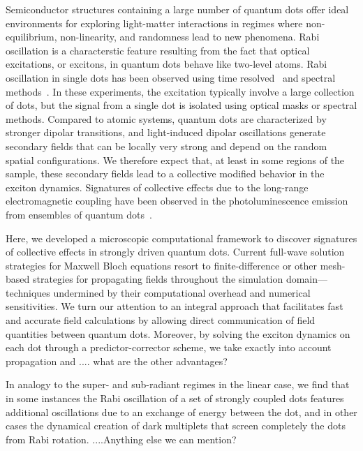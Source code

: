Semiconductor structures containing a large number of quantum dots offer ideal environments for exploring light-matter interactions in regimes where non-equilibrium, non-linearity, and randomness lead to new phenomena.
Rabi oscillation is a characterstic feature resulting from the fact that optical excitations, or excitons, in quantum dots behave like two-level atoms.
Rabi oscillation in single dots has been observed using time resolved~\cite{stievater, shih} and spectral methods~\cite{kamada}.
 In these experiments, the excitation typically involve a large collection of dots, but the signal from a single dot is isolated using optical masks or spectral methods.
Compared to atomic systems, quantum dots are characterized by stronger dipolar transitions, and light-induced dipolar oscillations generate secondary fields that can be locally very strong and depend on the random spatial configurations.
We therefore expect that, at least in some regions of the sample, these secondary fields lead to a collective modified behavior in the exciton dynamics.
 Signatures of collective effects due to the long-range electromagnetic coupling have been observed in the photoluminescence emission from ensembles of quantum dots~\cite{forchel}.


Here, we developed a microscopic computational framework to discover signatures of collective effects in strongly driven quantum dots.
Current full-wave solution strategies for Maxwell Bloch equations resort to finite-difference or other mesh-based strategies\cite{Vanneste2001, Fratalocchi2008} for propagating fields throughout the simulation domain---techniques undermined by their computational overhead and numerical sensitivities\cite{Baczewski2013}.
We turn our attention to an integral approach that facilitates fast and accurate field calculations by allowing direct communication of field quantities between quantum dots.
Moreover, by solving the exciton dynamics on each dot through a predictor-corrector scheme, we take exactly into account propagation and .... what are the other advantages? 

In analogy to the super- and sub-radiant regimes in the linear case, we find that in some instances the Rabi oscillation of a set of strongly coupled dots features additional oscillations due to an exchange of energy between the dot, and in other cases the dynamical creation of dark multiplets that screen completely the dots from Rabi rotation. ....Anything else we can mention?
